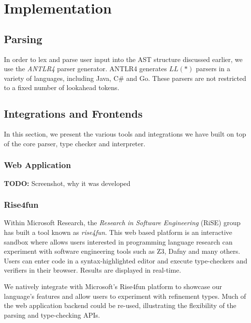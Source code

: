 \documentclass[a4paper,openany,12pt]{book}
\newcommand{\todobox}[1] {\colorbox{todocolor}{\parbox{\dimexpr \linewidth-\columnsep}{\vspace{.75\baselineskip}\centering\parbox{0.95\linewidth}{\faIcon{lightbulb} \textbf{TODO:} #1\vspace{.75\baselineskip}}}}}
\begin{document}
\section{Implementation}

\subsection{Parsing}

In order to lex and parse user input into the AST structure discussed earlier, we use the \emph{ANTLR4} parser generator.
ANTLR4 generates $LL(*)$ parsers in a variety of languages, including Java, C\# and Go.
These parsers are not restricted to a fixed number of lookahead tokens.



\subsection{Integrations and Frontends}

In this section, we present the various tools and integrations we have built on top of the core parser, type checker
and interpreter.

\subsubsection{Web Application}



\todobox{Screenshot, why it was developed}

\subsubsection{Rise4fun}

Within Microsoft Research, the \emph{Research in Software Engineering} (RiSE) group has built a tool known as
\emph{rise4fun}.
This web based platform is an interactive sandbox where allows users interested in programming language research can
experiment with software engineering tools such as Z3, Dafny and many others.
Users can enter code in a syntax-highlighted editor and execute type-checkers and verifiers in their browser.
Results are displayed in real-time.

We natively integrate with Microsoft's Rise4fun platform to showcase our language's features and allow users to
experiment with refinement types.
Much of the web application backend could be re-used, illustrating the flexibility of the parsing and type-checking
APIs.
\end{document}

